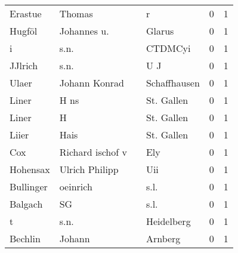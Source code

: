 \begin{center}
\begin{tiny}
\begin{longtabu}{llllrr}
                  Erastue &                             Thomas &             &                                           r &          0 &         1 \\
                   Hugföl &                        Johannes u. &             &                                      Glarus &          0 &         1 \\
                        i &                               s.n. &             &                                     CTDMCyi &          0 &         1 \\
                  JJlrich &                               s.n. &             &                                         U J &          0 &         1 \\
                    Ulaer &                      Johann Konrad &             &                                Schaffhausen &          0 &         1 \\
                    Liner &                               H ns &             &                                  St. Gallen &          0 &         1 \\
                    Liner &                                  H &             &                                  St. Gallen &          0 &         1 \\
                    Liier &                               Hais &             &                                  St. Gallen &          0 &         1 \\
                      Cox &                   Richard ischof v &             &                                         Ely &          0 &         1 \\
                 Hohensax &                     Ulrich Philipp &             &                                         Uii &          0 &         1 \\
                Bullinger &                           oeinrich &             &                                        s.l. &          0 &         1 \\
                  Balgach &                                 SG &             &                                        s.l. &          0 &         1 \\
                        t &                               s.n. &             &                                  Heidelberg &          0 &         1 \\
                  Bechlin &                             Johann &             &                                     Arnberg &          0 &         1 \\

\end{longtabu}
\end{tiny}
\end{center}
